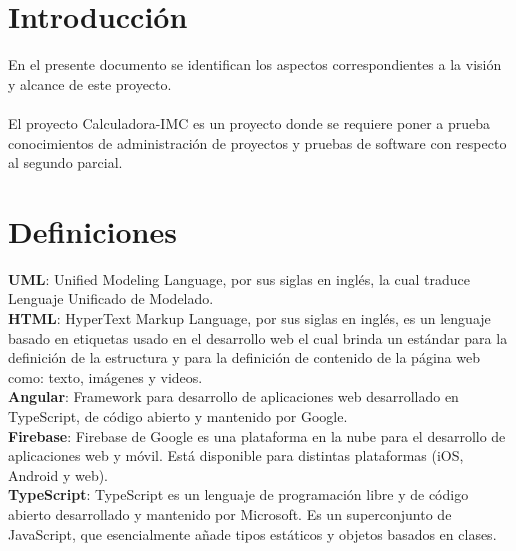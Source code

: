 \documentclass[12pt,a4paper]{book}
\date{\today}
\begin{document}
 	

\tableofcontents
\newpage

\section{Introducción}
\vspace{0.5 cm}
En el presente documento se identifican los aspectos correspondientes a la visión y alcance de este proyecto.\\
\\ El proyecto Calculadora-IMC es un proyecto donde se requiere poner a prueba conocimientos de administración de proyectos y pruebas de software con respecto al segundo parcial.
		
\section{Definiciones}
\vspace{0.5 cm}
\textbf {UML}: Unified Modeling Language, por sus siglas en inglés, la cual traduce
Lenguaje Unificado de Modelado.\\

\textbf {HTML}: HyperText Markup Language, por sus siglas en inglés, es un lenguaje
basado en etiquetas usado en el desarrollo web el cual brinda un estándar para
la definición de la estructura y para la definición de contenido de la página web
como: texto, imágenes y videos.\\

\textbf {Angular}: Framework para desarrollo de aplicaciones web desarrollado en TypeScript, de código abierto y mantenido por Google.\\

\textbf {Firebase}: Firebase de Google es una plataforma en la nube para el desarrollo de aplicaciones web y móvil. Está disponible para distintas plataformas (iOS, Android y web).\\

\textbf {TypeScript}: TypeScript es un lenguaje de programación libre y de código abierto desarrollado y mantenido por Microsoft. Es un superconjunto de JavaScript, que esencialmente añade tipos estáticos y objetos basados en clases.\\
\end{document}
